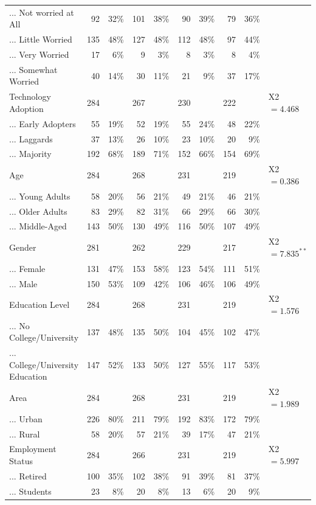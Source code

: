 \begin{table}[!htbp]
{\begin{tabular}{lrrrrrrrrl}
... Not worried at All & 92 & 32\% & 101 & 38\% & 90 & 39\% & 79 & 36\% &  \\ 
... Little Worried & 135 & 48\% & 127 & 48\% & 112 & 48\% & 97 & 44\% &  \\ 
... Very Worried & 17 & 6\% & 9 & 3\% & 8 & 3\% & 8 & 4\% &  \\ 
... Somewhat Worried & 40 & 14\% & 30 & 11\% & 21 & 9\% & 37 & 17\% &  \\ 
Technology Adoption & 284 &  & 267 &  & 230 &  & 222 &  & X2$=4.468^{}$ \\ 
... Early Adopters & 55 & 19\% & 52 & 19\% & 55 & 24\% & 48 & 22\% &  \\ 
... Laggards & 37 & 13\% & 26 & 10\% & 23 & 10\% & 20 & 9\% &  \\ 
... Majority & 192 & 68\% & 189 & 71\% & 152 & 66\% & 154 & 69\% &  \\ 
Age & 284 &  & 268 &  & 231 &  & 219 &  & X2$=0.386^{}$ \\ 
... Young Adults & 58 & 20\% & 56 & 21\% & 49 & 21\% & 46 & 21\% &  \\ 
... Older Adults & 83 & 29\% & 82 & 31\% & 66 & 29\% & 66 & 30\% &  \\ 
... Middle-Aged & 143 & 50\% & 130 & 49\% & 116 & 50\% & 107 & 49\% &  \\ 
Gender & 281 &  & 262 &  & 229 &  & 217 &  & X2$=7.835^{**}$ \\ 
... Female & 131 & 47\% & 153 & 58\% & 123 & 54\% & 111 & 51\% &  \\ 
... Male & 150 & 53\% & 109 & 42\% & 106 & 46\% & 106 & 49\% &  \\ 
Education Level & 284 &  & 268 &  & 231 &  & 219 &  & X2$=1.576^{}$ \\ 
... No College/University & 137 & 48\% & 135 & 50\% & 104 & 45\% & 102 & 47\% &  \\ 
... College/University Education & 147 & 52\% & 133 & 50\% & 127 & 55\% & 117 & 53\% &  \\ 
Area & 284 &  & 268 &  & 231 &  & 219 &  & X2$=1.989^{}$ \\ 
... Urban & 226 & 80\% & 211 & 79\% & 192 & 83\% & 172 & 79\% &  \\ 
... Rural & 58 & 20\% & 57 & 21\% & 39 & 17\% & 47 & 21\% &  \\ 
Employment Status & 284 &  & 266 &  & 231 &  & 219 &  & X2$=5.997^{}$ \\ 
... Retired & 100 & 35\% & 102 & 38\% & 91 & 39\% & 81 & 37\% &  \\ 
... Students & 23 & 8\% & 20 & 8\% & 13 & 6\% & 20 & 9\% &  \\ 

\end{tabular}}
\end{table}
